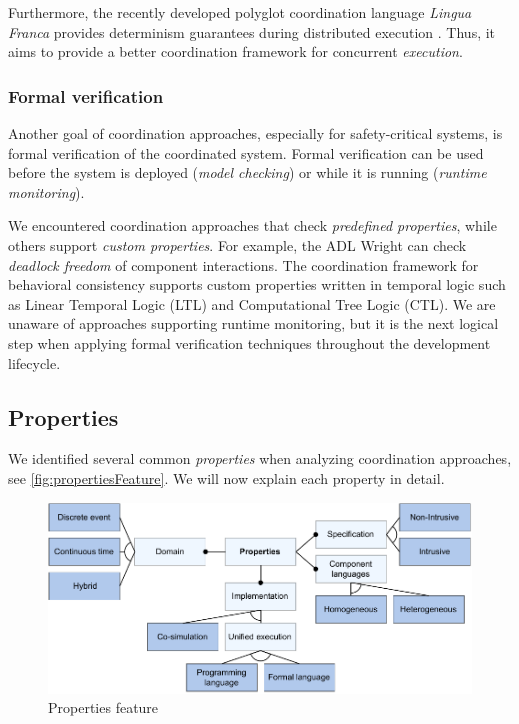 \documentclass[runningheads]{llncs}
\begin{document}
Furthermore, the recently developed polyglot coordination language \textit{Lingua Franca} provides determinism guarantees during distributed execution \cite{lohstrohLinguaFrancaDeterministic2021}.
Thus, it aims to provide a better coordination framework for concurrent \textit{execution}.


\subsubsection{Formal verification} Another goal of coordination approaches, especially for safety-critical systems, is formal verification of the coordinated system.
Formal verification can be used before the system is deployed (\textit{model checking}) or while it is running (\textit{runtime monitoring}).

We encountered coordination approaches that check \textit{predefined properties}, while others support \textit{custom properties}.
For example, the ADL Wright \cite{allenFormalBasisArchitectural1997} can check \textit{deadlock freedom} of component interactions.
The coordination framework for behavioral consistency \cite{krauterBehavioralConsistencyMultimodeling2023} supports custom properties written in temporal logic such as Linear Temporal Logic (LTL) and Computational Tree Logic (CTL).
We are unaware of approaches supporting runtime monitoring, but it is the next logical step when applying formal verification techniques throughout the development lifecycle.

\subsection{Properties}
We identified several common \textit{properties} when analyzing coordination approaches, see \autoref{fig:propertiesFeature}.
We will now explain each property in detail.

\begin{figure}[ht]
	\centering
	\includegraphics[width=1\textwidth]{images/properties_feature}
	\caption{Properties feature}
	\label{fig:propertiesFeature}
\end{figure}
\end{document}
